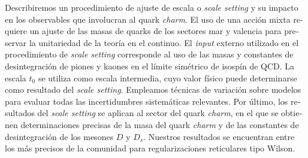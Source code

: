 \begin{otherlanguage}{spanish}
Describiremos un procedimiento de ajuste de escala o \textit{scale setting} y su impacto en los observables que involucran al quark \textit{charm}. El uso de una acción mixta requiere un ajuste de las masas de quarks de los sectores mar y valencia para preservar la unitariedad de la teoría en el continuo. El \textit{input} externo utilizado en el procedimiento de \textit{scale setting} corresponde al uso de las masas y constantes de desintegración de piones y kaones en el límite simétrico de isospín de QCD. La escala $t_0$ se utiliza como escala intermedia, cuyo valor físico puede determinarse como resultado del \textit{scale setting}. Empleamos técnicas de variación sobre modelos para evaluar todas las incertidumbres sistemáticas relevantes. Por último, los resultados del \textit{scale setting} se aplican al sector del quark \textit{charm}, en el que se obtienen determinaciones precisas de la masa del quark \textit{charm} y de las constantes de desintegración de los mesones $D$ y $D_s$. Nuestros resultados se encuentran entre los más precisos de la comunidad para regularizaciones reticulares tipo Wilson.

\end{otherlanguage}

\endgroup

\vfill
